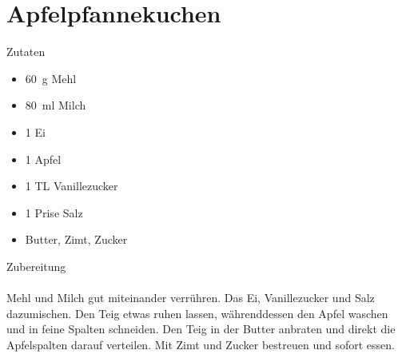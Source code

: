 \section*{Apfelpfannekuchen}
\ihead{}\ohead{}
\cfoot{}
{\Large Zutaten}
\begin{multicols}{2}
\begin{itemize}
    \item \SI{60}{g} Mehl
    \item \SI{80}{ml} Milch
    \item \num{1} Ei
    \item \num{1} Apfel
    \item \num{1} TL Vanillezucker
    \item \num{1} Prise Salz
    \item Butter, Zimt, Zucker
\end{itemize}
\end{multicols}
\noindent
{\Large Zubereitung}\\
\\
Mehl und Milch gut miteinander verrühren. 
Das Ei, Vanillezucker und Salz dazumischen.
Den Teig etwas ruhen lassen, währenddessen den Apfel waschen und in feine Spalten schneiden.
Den Teig in der Butter anbraten und direkt die Apfelspalten darauf verteilen.
Mit Zimt und Zucker bestreuen und sofort essen.